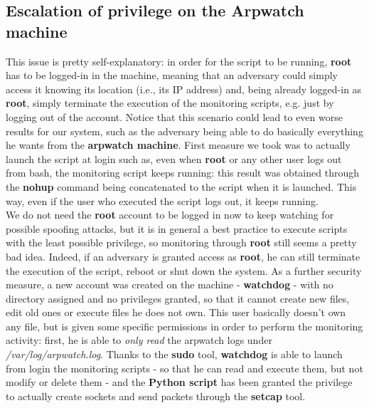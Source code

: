 \subsection{Escalation of privilege on the Arpwatch machine}
This issue is pretty self-explanatory: in order for the script to be running, \textbf{root} has to be logged-in in the machine, meaning that an adversary could simply access it knowing its location (i.e., its IP address) and, being already logged-in as \textbf{root}, simply terminate the execution of the monitoring scripts, e.g. just by logging out of the account. Notice that this scenario could lead to even worse results for our system, such as the adversary being able to do basically everything he wants from the \textbf{arpwatch machine}. First measure we took was to actually launch the script at login such as, even when \textbf{root} or any other user logs out from bash, the monitoring script keeps running: this result was obtained through the \textbf{nohup} command being concatenated to the script when it is launched. This way, even if the user who executed the script logs out, it keeps running.\\
We do not need the \textbf{root} account to be logged in now to keep watching for possible spoofing attacks, but it is in general a best practice to execute scripts with the least possible privilege, so monitoring through \textbf{root} still seems a pretty bad idea. Indeed, if an adversary is granted access as \textbf{root}, he can still terminate the execution of the script, reboot or shut down the system. As a further security measure, a new account was created on the machine - \textbf{watchdog} - with no directory assigned and no privileges granted, so that it cannot create new files, edit old ones or execute files he does not own. This user basically doesn't own any file, but is given some specific permissions in order to perform the monitoring activity: first, he is able to \textit{only read} the arpwatch logs under \textit{/var/log/arpwatch.log}. Thanks to the \textbf{sudo} tool, \textbf{watchdog} is able to launch from login the monitoring scripts - so that he can read and execute them, but not modify or delete them - and the \textbf{Python script} has been granted the privilege to actually create sockets and send packets through the \textbf{setcap} tool.\\
